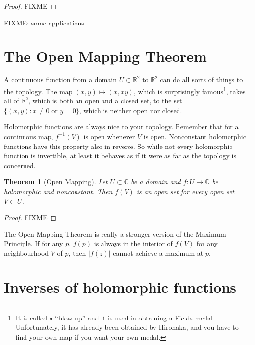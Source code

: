 \documentclass[12pt,openany]{book}
\newcommand{\sabs}[1]{\lvert {#1} \rvert}
\newcommand{\C}{{\mathbb{C}}}
\newcommand{\R}{{\mathbb{R}}}
\theoremstyle{plain}
\newtheorem{thm}{Theorem}[section]
\theoremstyle{remark}
\theoremstyle{definition}
\theoremstyle{exercise}
\theoremstyle{example}
\begin{document}
\begin{proof}
FIXME
\end{proof}

FIXME: some applications


\section{The Open Mapping Theorem}

A continuous function from a domain $U \subset \R^2$ to $\R^2$ can do all
sorts of things to the topology.  The map $(x,y) \mapsto (x,xy)$, which
is surprisingly famous\footnote{%
It is called a ``blow-up'' and it is used in obtaining a Fields medal.
Unfortunately, it has already been obtained by Hironaka, and you
have to find your own map if you want your own medal.},
takes all of $\R^2$, which is both an open and a closed set, to the
set $\{ (x,y) : x \not= 0 \text{ or } y=0 \}$, which is neither open nor
closed.

Holomorphic functions are always nice to your topology.
Remember that for a continuous map, $f^{-1}(V)$ is open whenever
$V$ is open.  Nonconstant holomorphic functions have this property also in
reverse.  So while not every holomorphic function is invertible, at least it
behaves as if it were as far as the topology is concerned.


\begin{thm}[Open Mapping]\label{thm:OMT}
Let $U \subset \C$ be a domain and $f \colon U \to \C$ be
holomorphic and nonconstant.  Then $f(V)$ is an open set for every open set
$V \subset U$.
\end{thm}

\begin{proof}
FIXME
\end{proof}

The Open Mapping Theorem is really a stronger version of the Maximum
Principle.
If for any $p$,
$f(p)$ is always in the interior of $f(V)$ for any neighbourhood $V$ of
$p$, then $\sabs{f(z)}$ cannot achieve a maximum at $p$.


\section{Inverses of holomorphic functions}
\end{document}
